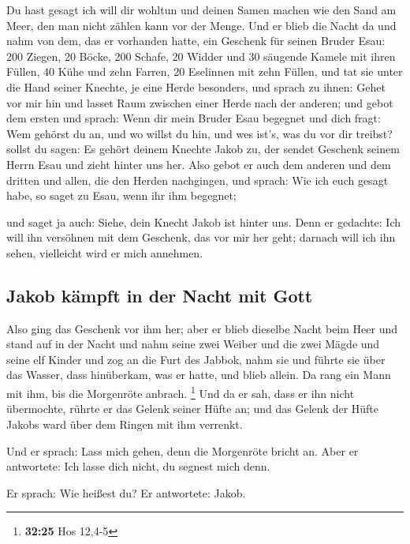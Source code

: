  Du hast gesagt ich will dir wohltun und deinen Samen
machen wie den Sand am Meer, den man nicht zählen kann vor der Menge.
 Und er blieb die Nacht da und nahm von dem, das er
vorhanden hatte, ein Geschenk für seinen Bruder Esau: 
200 Ziegen, 20 Böcke, 200 Schafe, 20 Widder  und 30
säugende Kamele mit ihren Füllen, 40 Kühe und zehn Farren, 20 Eselinnen
mit zehn Füllen,  und tat sie unter die Hand seiner
Knechte, je eine Herde besonders, und sprach zu ihnen: Gehet vor mir hin
und lasset Raum zwischen einer Herde nach der anderen; 
und gebot dem ersten und sprach: Wenn dir mein Bruder Esau begegnet und
dich fragt: Wem gehörst du an, und wo willst du hin, und wes ist's, was
du vor dir treibst?  sollst du sagen: Es gehört deinem
Knechte Jakob zu, der sendet Geschenk seinem Herrn Esau und zieht hinter
uns her.  Also gebot er auch dem anderen und dem dritten
und allen, die den Herden nachgingen, und sprach: Wie ich euch gesagt
habe, so saget zu Esau, wenn ihr ihm begegnet;

 und saget ja auch: Siehe, dein Knecht Jakob ist hinter
uns. Denn er gedachte: Ich will ihn versöhnen mit dem Geschenk, das vor
mir her geht; darnach will ich ihn sehen, vielleicht wird er mich
annehmen.

\hypertarget{jakob-kuxe4mpft-in-der-nacht-mit-gott}{%
\subsection{Jakob kämpft in der Nacht mit
Gott}\label{jakob-kuxe4mpft-in-der-nacht-mit-gott}}

 Also ging das Geschenk vor ihm her; aber er blieb
dieselbe Nacht beim Heer  und stand auf in der Nacht und
nahm seine zwei Weiber und die zwei Mägde und seine elf Kinder und zog
an die Furt des Jabbok,  nahm sie und führte sie über das
Wasser, dass hinüberkam, was er hatte,  und blieb allein.
Da rang ein Mann mit ihm, bis die Morgenröte anbrach. \footnote{\textbf{32:25}
  Hos 12,4-5}  Und da er sah, dass er ihn nicht
übermochte, rührte er das Gelenk seiner Hüfte an; und das Gelenk der
Hüfte Jakobs ward über dem Ringen mit ihm verrenkt.

 Und er sprach: Lass mich gehen, denn die Morgenröte
bricht an. Aber er antwortete: Ich lasse dich nicht, du segnest mich
denn.

 Er sprach: Wie heißest du? Er antwortete: Jakob.

